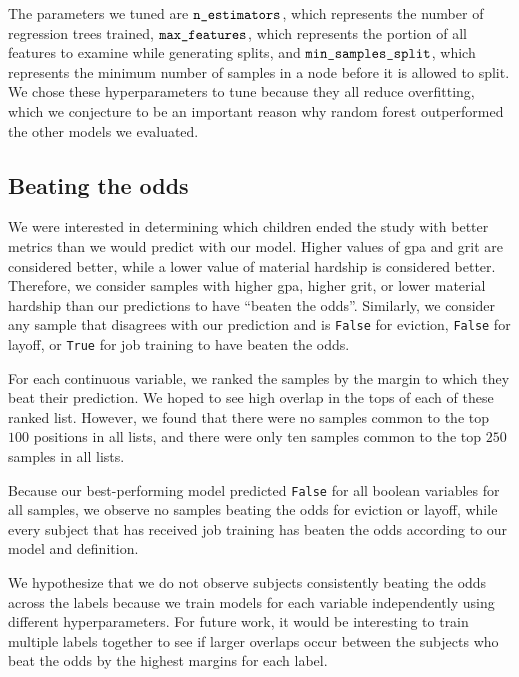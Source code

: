 \documentclass{article} %
\begin{document}
The parameters we tuned are $\texttt{n\textunderscore estimators}$, which represents the number of regression trees trained, $\texttt{max\textunderscore features}$, which represents the portion of all features to examine while generating splits, and $\texttt{min\textunderscore samples\textunderscore split}$, which represents the minimum number of samples in a node before it is allowed to split. We chose these hyperparameters to tune because they all reduce overfitting, which we conjecture to be an important reason why random forest outperformed the other models we evaluated.

\subsection{Beating the odds}
\label{sec:beatingtheodds}

We were interested in determining which children ended the study with better metrics than we would predict with our model. Higher values of gpa and grit are considered better, while a lower value of material hardship is considered better. Therefore, we consider samples with higher gpa, higher grit, or lower material hardship than our predictions to have ``beaten the odds''. Similarly, we consider any sample that disagrees with our prediction and is \texttt{False} for eviction, \texttt{False} for layoff, or \texttt{True} for job training to have beaten the odds.

For each continuous variable, we ranked the samples by the margin to which they beat their prediction. We hoped to see high overlap in the tops of each of these ranked list. However, we found that there were no samples common to the top $100$ positions in all lists, and there were only ten samples common to the top $250$ samples in all lists.

Because our best-performing model predicted \texttt{False} for all boolean variables for all samples, we observe no samples beating the odds for eviction or layoff, while every subject that has received job training has beaten the odds according to our model and definition.

We hypothesize that we do not observe subjects consistently beating the odds across the labels because we train models for each variable independently using different hyperparameters. For future work, it would be interesting to train multiple labels together to see if larger overlaps occur between the subjects who beat the odds by the highest margins for each label.
\end{document}
